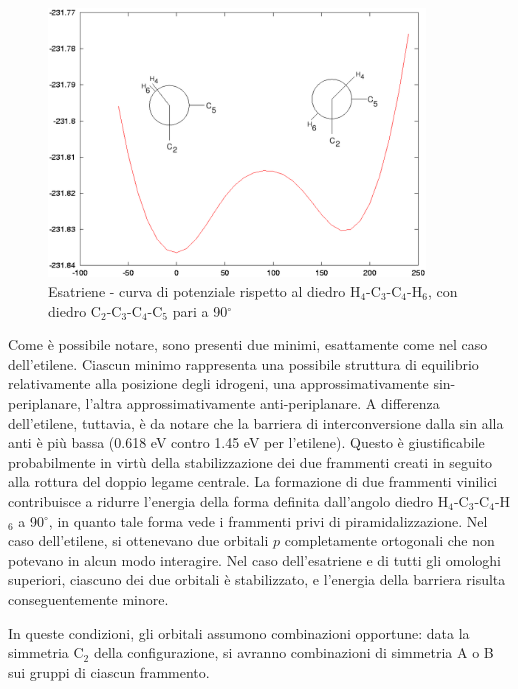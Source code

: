 \begin{figure}[htb]
\caption{\small Esatriene - curva di potenziale rispetto al diedro
\mbox{H$_4$-C$_3$-C$_4$-H$_6$}, con diedro \mbox{C$_2$-C$_3$-C$_4$-C$_5$}
pari a 90$^{\circ}$}
\label{fig:esatriene_c090}
\begin{center}
\includegraphics[width=10cm,keepaspectratio]{immagini/esatriene/c090.eps}
\end{center}
\end{figure}


Come \`e possibile notare, sono presenti due minimi, esattamente come nel
caso dell'etilene. Ciascun minimo rappresenta una possibile struttura di
equilibrio relativamente alla posizione degli idrogeni, una
approssimativamente sin-periplanare, l'altra approssimativamente
anti-periplanare. A differenza dell'etilene, tuttavia, \`e da notare che la
barriera di interconversione dalla sin alla anti \`e pi\`u bassa
(0.618 eV contro 1.45 eV per l'etilene). Questo \`e giustificabile
probabilmente in virt\`u della stabilizzazione dei due frammenti creati in
seguito alla rottura del doppio legame centrale. La formazione di due
frammenti vinilici contribuisce a ridurre l'energia della forma definita
dall'angolo diedro \mbox{H$_4$-C$_3$-C$_4$-H$_6$} a 90$^{\circ}$, in quanto tale forma
vede i frammenti privi di piramidalizzazione. Nel caso dell'etilene, si
ottenevano due orbitali $p$ completamente ortogonali che non potevano in
alcun modo interagire. Nel caso dell'esatriene e di tutti gli omologhi
superiori, ciascuno dei due orbitali \`e stabilizzato, e l'energia della
barriera risulta conseguentemente minore.

In queste condizioni, gli orbitali assumono combinazioni opportune: data la
simmetria C$_2$ della configurazione, si avranno combinazioni di simmetria
A o B sui gruppi di ciascun frammento.

